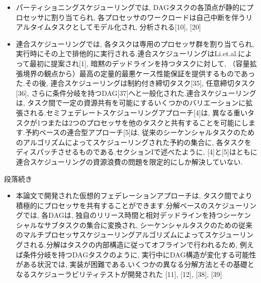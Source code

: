 \begin{frame}{}
    \begin{itemize}
        \item パーティショニングスケジューリングでは, DAGタスクの各頂点が静的にプロセッサに割り当てられ, 各プロセッサのワークロードは自己中断を伴うリアルタイムタスクとしてモデル化され, 分析される[10], [20]
\item 連合スケジューリングでは, 各タスクは専用のプロセッサ群を割り当てられ, 実行時にその上で排他的に実行される.連合スケジューリングはLi.et.al.によって最初に提案され[1], 暗黙のデッドラインを持つタスクに対して, （容量拡張境界の観点から）最高の定量的最悪ケース性能保証を提供するものであった.その後, 連合スケジューリングは制約付き締切タスク[35], 任意締切タスク[36], さらに条件分岐を持つDAG[37]へと一般化された.連合スケジューリングは, タスク間で一定の資源共有を可能にするいくつかのバリエーションに拡張される.セミフェデレートスケジューリングアプローチ[4]は, 異なる重いタスクが1つまたは2つのプロセッサを他のタスクと共有することを可能にします.予約ベースの連合型アプローチ[5]は, 従来のシーケンシャルタスクのためのアルゴリズムによってスケジューリングされた予約の集合に, 各タスクをディスパッチさせるものである.セクションIで述べたように, [4]と[5]はともに連合スケジューリングの資源浪費の問題を限定的にしか解決していない.
    \end{itemize}
\end{frame}

\begin{frame}{段落続き}
    \begin{itemize}
        \item 本論文で開発された仮想的フェデレーションアプローチは, タスク間でより積極的にプロセッサを共有することができます.分解ベースのスケジューリングでは, 各DAGは, 独自のリリース時間と相対デッドラインを持つシーケンシャルなサブタスクの集合に変換され, シーケンシャルタスクのための従来のマルチプロセッサスケジューリングアルゴリズムによってスケジューリングされる.分解はタスクの内部構造に従ってオフラインで行われるため, 例えば条件分岐を持つDAGタスクのように, 実行中にDAG構造が変化する可能性がある状況では, 実装が困難である.いくつかの異なる分解方法とその基礎となるスケジューラビリティテストが開発された [11], [12], [38], [39]
    \end{itemize}
\end{frame}
